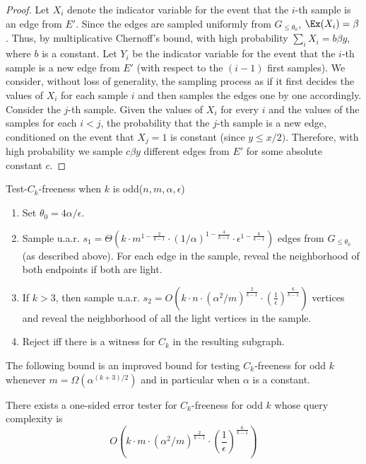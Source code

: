 \begin{proof}
    Let $X_i$ denote the indicator variable for the event that the $i$-th sample is an edge from $E'$. Since the edges are sampled uniformly from $G_{\leq \theta_0}$, $\Ex(X_i) = \beta$.
    Thus, by multiplicative Chernoff's bound, with high probability $\sum_i X_i = b \beta y$, where $b$ is a constant.
    Let $Y_i$ be the indicator variable for the event that the $i$-th sample is a new edge from $E'$ (with respect to the $(i-1)$ first samples).
    We consider, without loss of generality, the sampling process as if it first decides the values of $X_i$ for each sample $i$ and then samples the edges one by one accordingly.
    Consider the $j$-th sample.
    Given the values of $X_i$ for every $i$ and the values of the samples for each $i < j$, the probability that the $j$-th sample is a new edge, conditioned on the event that $X_j = 1$ is constant (since $y \leq x/2)$. Therefore, with high probability we sample $c \beta y$ different edges from $E'$ for some absolute constant $c$.
\end{proof}


\bigskip
\textsf{Test-$C_k$-freeness when $k$ is odd}($n, m, \alpha, \epsilon$)
\begin{enumerate}
\item Set $\theta_0 = 4\alpha/\epsilon$.
\item Sample u.a.r. $s_1 = \Theta \left(k \cdot m^{1-\frac{2}{k-1}} \cdot (1/\alpha)^{1-\frac{4}{k-1}} \cdot \epsilon^{1-\frac{6}{k-1}}\right)$ edges from $G_{\leq \theta_0}$ (as described above).
For each edge in the sample,  reveal the neighborhood of both endpoints if both are light.
\item If $k > 3$, then sample u.a.r. $s_2 = O\left(k \cdot n \cdot (\alpha^2/m)^{\frac{2}{k-1}} \cdot \left( \frac{1}{\epsilon}\right)^{\frac{6}{k-1}} \right)$ vertices and reveal the neighborhood of all the light vertices in the sample.
\item Reject iff there is a witness for $C_k$ in the resulting subgraph.
\end{enumerate}

The following bound is an improved bound for testing $C_k$-freeness for odd $k$ whenever $m = \Omega(\alpha^{(k+3)/2})$ and in particular when $\alpha$ is a constant.
\begin{theorem}\label{thm:Ck-ub-odd-k}
There exists a one-sided error tester for $C_k$-freeness for odd $k$ whose query complexity is
$$O\left(k \cdot m \cdot (\alpha^2/m)^{\frac{2}{k-1}} \cdot \left( \frac{1}{\epsilon}\right)^{\frac{6}{k-1}} \right)$$
\end{theorem}

